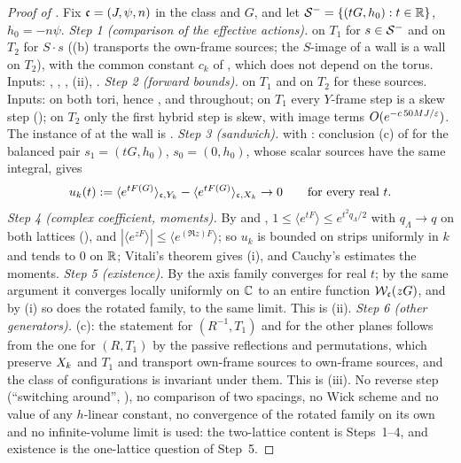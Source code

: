 \begin{proof}[Proof of ]
Fix $\mathfrak c=(J,\psi,n)$ in the class and $G$, and let $\mathcal S^-=\{(tG,h_0):t\in\mathbb R\}$, $h_0=-n\psi$.
\emph{Step 1 (comparison of the effective actions).}  on $T_1$ for $s\in\mathcal S^-$ and on $T_2$ for $S\cdot s$ ((b) transports the own-frame sources; the $S$-image of a wall is a wall on $T_2$), with the common constant $c_k$ of , which does not depend on the torus. Inputs: , , \cite[Thm.~3.3]{K1}, (ii), .
\emph{Step 2 (forward bounds).}  on $T_1$ and on $T_2$ for these sources. Inputs:  on both tori, hence ,  and  throughout; on $T_1$ every $Y$-frame step is a skew step (); on $T_2$ only the first hybrid step is skew, with image terms $O(e^{-c\,50MJ/\varepsilon})$. The instance of  at the wall is .
\emph{Step 3 (sandwich).}  with : conclusion (c) of  for the balanced pair $s_1=(tG,h_0)$, $s_0=(0,h_0)$, whose scalar sources have the same integral, gives
\[
u_k(t):=\langle e^{tF(G)}\rangle_{\mathfrak c,Y_k}-\langle e^{tF(G)}\rangle_{\mathfrak c,X_k}\to0\qquad\text{for every real }t .
\]
\emph{Step 4 (complex coefficient, moments).} By  and , $1\le\langle e^{tF}\rangle\le e^{t^2q_\Lambda/2}$ with $q_\Lambda\to q$ on both lattices (), and $|\langle e^{zF}\rangle|\le\langle e^{(\Re z)F}\rangle$; so $u_k$ is bounded on strips uniformly in $k$ and tends to $0$ on $\mathbb R$; Vitali's theorem \cite{Hor90} gives (i), and Cauchy's estimates the moments.
\emph{Step 5 (existence).} By  the axis family converges for real $t$; by the same argument it converges locally uniformly on $\mathbb C$ to an entire function $\mathcal W_{\mathfrak c}(zG)$, and by (i) so does the rotated family, to the same limit. This is (ii).
\emph{Step 6 (other generators).} (c): the statement for $(R^{-1},T_1)$ and for the other planes follows from the one for $(R,T_1)$ by the passive reflections and permutations, which preserve $X_k$ and $T_1$ and transport own-frame sources to own-frame sources, and the class of configurations is invariant under them. This is (iii).
No reverse step (``switching around'', \cite[p.~337]{K2}), no comparison of two spacings, no Wick scheme and no value of any $h$-linear constant, no convergence of the rotated family on its own and no infinite-volume limit is used: the two-lattice content is Steps~1--4, and existence is the one-lattice question of Step~5.
\end{proof}

